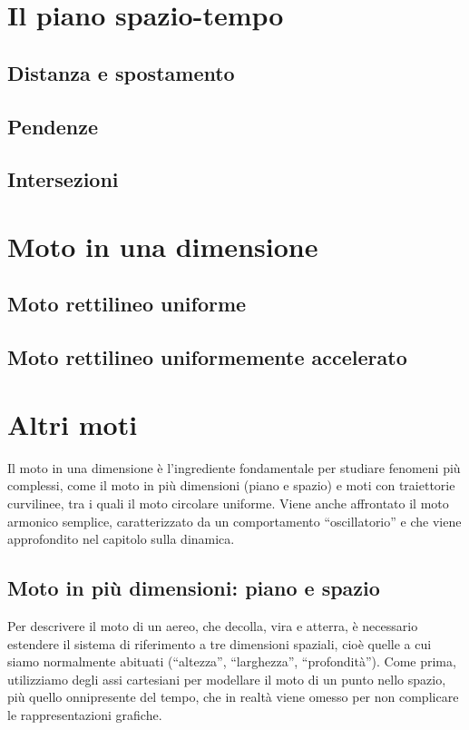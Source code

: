 \section{Il piano spazio-tempo}
\subsection{Distanza e spostamento}

\subsection{Pendenze}
\subsection{Intersezioni}

\section{Moto in una dimensione}
\subsection{Moto rettilineo uniforme}
\subsection{Moto rettilineo uniformemente accelerato}


\section{Altri moti}
Il moto in una dimensione è l'ingrediente fondamentale per studiare
fenomeni più complessi, come il moto in più dimensioni (piano e spazio)
e moti con traiettorie curvilinee, tra i quali il moto circolare
uniforme. Viene anche affrontato il moto armonico semplice, caratterizzato
da un comportamento ``oscillatorio'' e che viene approfondito nel
capitolo sulla dinamica.

\subsection{Moto in più dimensioni: piano e spazio}
Per descrivere il moto di un aereo, che decolla, vira e atterra, è
necessario estendere il sistema di riferimento a tre dimensioni spaziali,
cioè quelle a cui siamo normalmente abituati (``altezza'', ``larghezza'',
``profondità''). Come prima, utilizziamo degli assi cartesiani per
modellare il moto di un punto nello spazio, più quello onnipresente
del tempo, che in realtà viene omesso per non complicare le rappresentazioni
grafiche.

